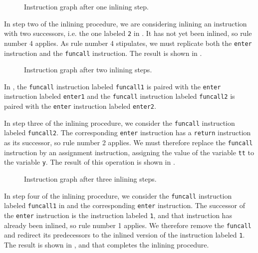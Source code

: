 \begin{figure}
\begin{center}
\end{center}
\caption{\label{fig43}
Instruction graph after one inlining step.}
\end{figure}

In step two of the inlining procedure, we are considering inlining an
instruction with two successors, i.e. the one labeled \texttt{2} in
.  It has not yet been inlined, so rule number 4
applies.  As rule number 4 stipulates, we must replicate both the
\texttt{enter} instruction and the \texttt{funcall} instruction.  The
result is shown in .

\begin{figure}
\begin{center}
\end{center}
\caption{\label{fig44}
Instruction graph after two inlining steps.}
\end{figure}

In , the \texttt{funcall} instruction labeled
\texttt{funcall1} is paired with the \texttt{enter} instruction
labeled \texttt{enter1} and the \texttt{funcall} instruction labeled
\texttt{funcall2} is paired with the \texttt{enter} instruction
labeled \texttt{enter2}.

In step three of the inlining procedure, we consider the
\texttt{funcall} instruction labeled \texttt{funcall2}.  The
corresponding \texttt{enter} instruction has a \texttt{return}
instruction as its successor, so rule number 2 applies.  We must
therefore replace the \texttt{funcall} instruction by an assignment
instruction, assigning the value of the variable \texttt{tt} to the
variable \texttt{y}.  The result of this operation is shown in
.

\begin{figure}
\begin{center}
\end{center}
\caption{\label{fig45}
Instruction graph after three inlining steps.}
\end{figure}

In step four of the inlining procedure, we consider the
\texttt{funcall} instruction labeled \texttt{funcall1} in
 and the corresponding \texttt{enter} instruction. The
successor of the \texttt{enter} instruction is the instruction labeled
\texttt{1}, and that instruction has already been inlined, so rule
number 1 applies.  We therefore remove the \texttt{funcall} and
redirect its predecessors to the inlined version of the instruction
labeled \texttt{1}.  The result is shown in , and that
completes the inlining procedure.

